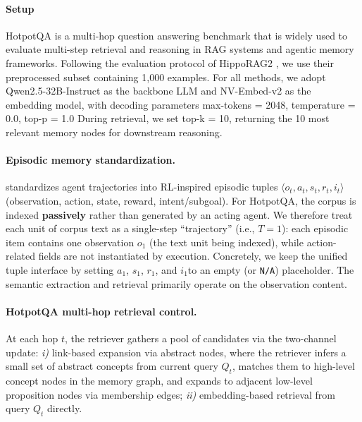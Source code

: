 \paragraph{Setup} 
HotpotQA \citep{yang2018hotpotqadatasetdiverseexplainable} is a multi-hop question answering benchmark that is widely used to evaluate multi-step retrieval and reasoning in RAG systems and agentic memory frameworks. Following the evaluation protocol of HippoRAG2 \citep{gutiérrez2025ragmemorynonparametriccontinual}, we use their preprocessed subset containing 1,000 examples. For all methods, we adopt Qwen2.5-32B-Instruct \citep{qwen2025qwen25technicalreport} as the backbone LLM and NV-Embed-v2 \citep{lee2025nvembedimprovedtechniquestraining} as the embedding model, with decoding parameters max-tokens = 2048, temperature = 0.0, top-p = 1.0 During retrieval, we set top-k = 10, returning the 10 most relevant memory nodes for downstream reasoning.

\paragraph{Episodic memory standardization.} \plugmem standardizes agent trajectories into RL-inspired episodic tuples
$\langle o_t, a_t, s_t, r_t, i_t\rangle$ (observation, action, state, reward, intent/subgoal).
For HotpotQA, the corpus is indexed \textbf{passively} rather than generated by an acting agent.
We therefore treat each unit of corpus text as a single-step ``trajectory'' (i.e., $T=1$):
each episodic item contains one observation $o_1$ (the text unit being indexed), while action-related fields are not instantiated by execution.
Concretely, we keep the unified tuple interface by setting $a_1$, $s_1$, $r_1$, and $i_1$to an empty (or \texttt{N/A}) placeholder. The semantic extraction and retrieval primarily operate on the observation content.


\paragraph{HotpotQA multi-hop retrieval control.}
At each hop $t$, the retriever gathers a pool of candidates via the two-channel update: \textit{i)} link-based expansion via abstract nodes, where the retriever infers a small set of abstract concepts from current query $Q_t$, matches them to high-level concept nodes in the memory graph, and expands to adjacent low-level proposition nodes via membership edges; \textit{ii)} embedding-based retrieval from query $Q_t$ directly. 


